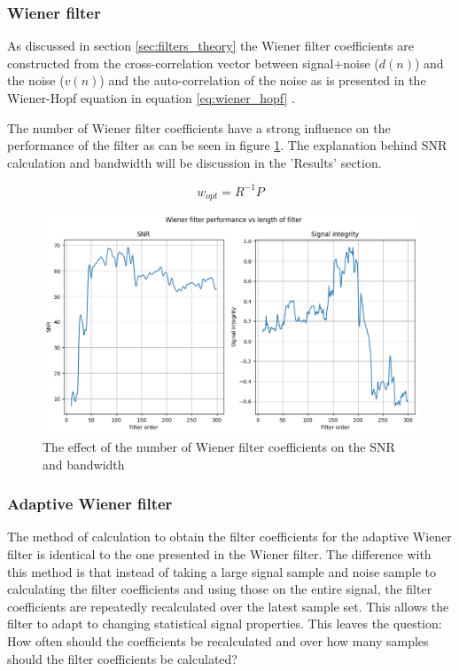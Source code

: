 \subsubsection{Wiener filter}
As discussed in section \ref{sec:filters_theory} the Wiener filter coefficients are constructed from the cross-correlation vector between signal+noise ($d(n)$) and the noise ($v(n)$) and the auto-correlation of the noise as is presented in the Wiener-Hopf equation in equation \ref{eq:wiener_hopf} \cite{lecture_adaptive_filters_1}. 

The number of Wiener filter coefficients have a strong influence on the performance of the filter as can be seen in figure \ref{fig:wiener_filter_length}. The explanation behind SNR calculation and bandwidth will be discussion in the 'Results' section.

\begin{equation}
    w_{opt} = R^{-1}P
    \label{eq:wiener_hopf}
\end{equation}

\begin{figure}[h!t]
	\begin{center}
		\includegraphics[width=1.0\columnwidth]{images/wiener_filter_length.png}
	\end{center}
	\caption{The effect of the number of Wiener filter coefficients on the SNR and bandwidth}
	\label{fig:wiener_filter_length}
\end{figure}

\subsubsection{Adaptive Wiener filter}
The method of calculation to obtain the filter coefficients for the adaptive Wiener filter is identical to the one presented in the Wiener filter. The difference with this method is that instead of taking a large signal sample and noise sample to calculating the filter coefficients and using those on the entire signal, the filter coefficients are repeatedly recalculated over the latest sample set. This allows the filter to adapt to changing statistical signal properties. This leaves the question: How often should the coefficients be recalculated and over how many samples should the filter coefficients be calculated?

